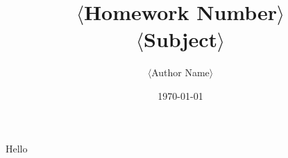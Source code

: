 \documentclass{article}
\title{\Huge{$\langle$Homework Number$\rangle$}
	\\
	\Large{$\langle$Subject$\rangle$}}
\author{$\langle$Author Name$\rangle$}
\date{\today}
\begin{document}
\maketitle
	
Hello
\end{document}
